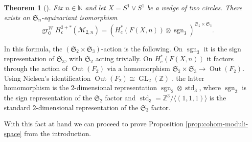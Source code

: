 \documentclass[12pt]{article}
\newcommand{\N}{\mathbb{N}}
\newcommand{\Z}{\mathbb{Z}}
\newcommand{\SymGroup}[1][n]{\mathfrak{S}_{#1}}
\newcommand{\ModuliCurve}[1]{\mathcal{M}_{#1}}
\newcommand{\sgn}[1][n]{\operatorname{sgn}_{#1}}
\DeclareMathOperator{\GL}{GL}
\DeclareMathOperator{\gr}{gr}
\DeclareMathOperator{\Out}{Out}
\theoremstyle{plain}
\newtheorem{thm}{Theorem}[section]
\theoremstyle{definition}
\theoremstyle{remark}
\begin{document}
\begin{thm}[{\cite[Theorem 1.2]{BCGY21}}]\label{thm:cohomology-tropical}
Fix $n \in \N$ and let $X = S^1\vee S^1$ be a wedge of two circles. There exists an $\SymGroup$-equivariant isomorphism
\begin{equation}\label{eq:BCGY}
    \gr_0^{W}H_c^{3+\ast}(\ModuliCurve{2, n}) = (H_c^{\ast}(F(X, n))\otimes \sgn[3])^{\SymGroup[2]\times\SymGroup[3]}.
\end{equation}
\end{thm}
In this formula, the $(\SymGroup[2]\times\SymGroup[3])$-action is the following. On $\sgn[3]$ it is the sign representation of $\SymGroup[3]$, with $\SymGroup[2]$ acting trivially. On $H_c^{\ast}(F(X,n))$ it factors through the action of $\Out(F_2)$ via a homomorphism $\SymGroup[2]\times\SymGroup[3]\to\Out(F_2)$. Using Nielsen's identification $\Out(F_2)\cong \GL_2(\Z)$ \cite{Nielsen1917}, the latter homomorphism is the $2$-dimensional representation $\sgn[2]\otimes \operatorname{std}_3$, where $\sgn[2]$ is the sign representation of the $\SymGroup[2]$ factor and $\operatorname{std}_3 = \Z^3/\langle(1,1,1)\rangle$ is the standard $2$-dimensional representation of the $\SymGroup[3]$ factor.


With this fact at hand we can proceed to prove Proposition \ref{prop:cohom-moduli-space} from the introduction.
\end{document}
